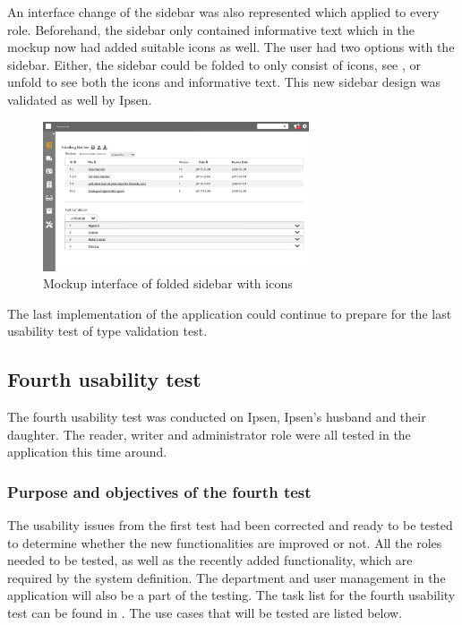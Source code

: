 An interface change of the sidebar was also represented which applied to every role.
Beforehand, the sidebar only contained informative text which in the mockup now had added suitable icons as well.
The user had two options with the sidebar.
Either, the sidebar could be folded to only consist of icons, see , or unfold to see both the icons and informative text.
This new sidebar design was validated as well by Ipsen.

\begin{figure}[H]
	\centering
		\includegraphics[width=0.7\textwidth]{billeder/ForsideFoldedSidebar.jpg}
	\caption{Mockup interface of folded sidebar with icons}\label{fig:mockupSidebarIcon}
\end{figure}

The last implementation of the application could continue to prepare for the last usability test of type validation test.

\subsection{Fourth usability test}\label{fourthtest}
The fourth usability test was conducted on Ipsen, Ipsen's husband and their daughter.
The reader, writer and administrator role were all tested in the application this time around.

\subsubsection*{Purpose and objectives of the fourth test}
The usability issues from the first test had been corrected and ready to be tested to determine whether the new functionalities are improved or not.
All the roles needed to be tested, as well as the recently added functionality, which are required by the system definition.
The department and user management in the application will also be a part of the testing.
The task list for the fourth usability test can be found in .
The use cases that will be tested are listed below.

